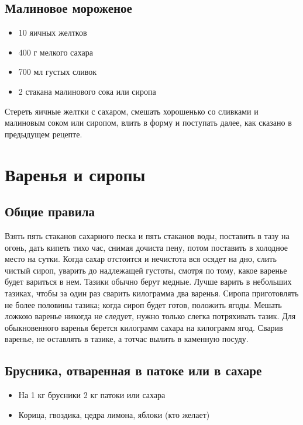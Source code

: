 \subsection{Малиновое мороженое}

\begin{itemize}
	\item 10 яичных желтков
    \item 400 г мелкого сахара
    \item 700 мл густых сливок
    \item 2 стакана малинового сока или сиропа
\end{itemize}

Стереть яичные желтки с сахаром, смешать хорошенько со сливками и малиновым соком или сиропом, влить в форму и поступать далее, как сказано в предыдущем рецепте.

\newpage
\section{Варенья и сиропы}

\subsection*{Общие правила} \label{sec:obschie-varenje}

Взять пять стаканов сахарного песка и пять стаканов воды, поставить в тазу на огонь, дать кипеть тихо час, снимая дочиста пену, потом поставить в холодное место на сутки. Когда сахар отстоится и нечистота вся осядет на дно, слить чистый сироп, уварить до надлежащей густоты, смотря по тому, какое варенье будет вариться в нем. Тазики обычно берут медные. Лучше варить в небольших тазиках, чтобы за один раз сварить килограмма два варенья. Сиропа приготовлять не более половины тазика; когда сироп будет готов, положить ягоды. Мешать ложкою варенье никогда не следует, нужно только слегка потряхивать тазик. Для обыкновенного варенья берется килограмм сахара на килограмм ягод. Сварив варенье, не оставлять в тазике, а тотчас вылить в каменную посуду.

\subsection{Брусника, отваренная в патоке или в сахаре}

\begin{itemize}
	\item На 1 кг брусники 2 кг патоки или сахара 
    \item Корица, гвоздика, цедра лимона, яблоки (кто желает)
\end{itemize}

